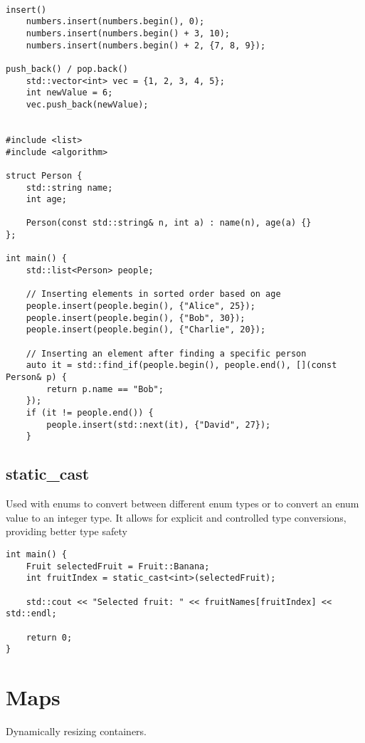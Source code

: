 \begin{verbatim}

insert()
    numbers.insert(numbers.begin(), 0); 
    numbers.insert(numbers.begin() + 3, 10);
    numbers.insert(numbers.begin() + 2, {7, 8, 9});

push_back() / pop.back()
    std::vector<int> vec = {1, 2, 3, 4, 5};
    int newValue = 6;
    vec.push_back(newValue);


#include <list>
#include <algorithm>

struct Person {
    std::string name;
    int age;

    Person(const std::string& n, int a) : name(n), age(a) {}
};

int main() {
    std::list<Person> people;

    // Inserting elements in sorted order based on age
    people.insert(people.begin(), {"Alice", 25});
    people.insert(people.begin(), {"Bob", 30});
    people.insert(people.begin(), {"Charlie", 20});

    // Inserting an element after finding a specific person
    auto it = std::find_if(people.begin(), people.end(), [](const Person& p) {
        return p.name == "Bob";
    });
    if (it != people.end()) {
        people.insert(std::next(it), {"David", 27});
    }
\end{verbatim}

\subsection{static\_cast}

Used with enums to convert between different enum types or to convert an enum value to an integer type.
It allows for explicit and controlled type conversions, providing better type safety

\begin{verbatim}
int main() {
    Fruit selectedFruit = Fruit::Banana;
    int fruitIndex = static_cast<int>(selectedFruit);

    std::cout << "Selected fruit: " << fruitNames[fruitIndex] << std::endl;

    return 0;
}
\end{verbatim}


\section{Maps}

Dynamically resizing containers.

